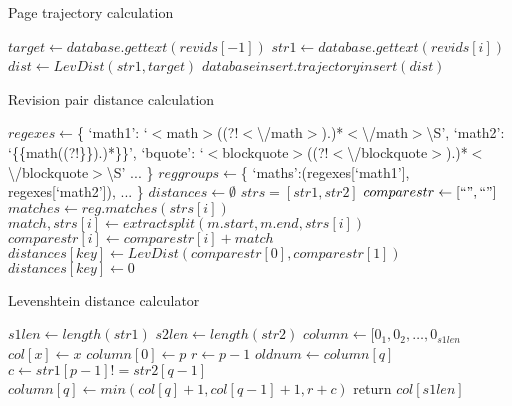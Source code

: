 \begin{algorithm}
\caption{Page trajectory calculation}\label{traj-calc}
  \begin{algorithmic}
    \State $target \gets database.gettext(revids[-1])$ 
    \State $str1 \gets database.gettext(revids[i])$
    \State $dist \gets LevDist(str1, target)$
    \State $databaseinsert.trajectoryinsert(dist)$
    \EndIf
    \EndFor
    \EndProcedure
  \end{algorithmic}
\end{algorithm}

\begin{algorithm}
  \caption{Revision pair distance calculation}\label{dist-calc}
  \begin{algorithmic}
    \State $regexes \gets $\{
    \Statex \tab`math1': `$<$math$>$((?!$<${\textbackslash}/math$>$).)*$<${\textbackslash}/math$>${\textbackslash}S',
    \Statex \tab`math2': `\{\{math((?!\}\}).)*\}\}',
    \Statex \tab`bquote': `$<$blockquote$>$((?!$<${\textbackslash}/blockquote$>$).)*$<${\textbackslash}/blockquote$>${\textbackslash}S'
    \Statex  \tab...
    \Statex\}
    \State $reggroups \gets $\{
    \Statex  \tab`maths':(regexes[`math1'], regexes[`math2']),
    \Statex  \tab...
    \Statex \}
    \State $distances \gets \emptyset$
    \State $strs = [str1, str2]$
    \State $comparestr \gets [``", ``"]$
    \State $matches \gets reg.matches(strs[i])$
    \State $match, strs[i] \gets extractsplit(m.start, m.end, strs[i])$
    \State $comparestr[i] \gets comparestr[i] + match$
    \EndFor
    \EndFor
    \State $distances[key] \gets LevDist(comparestr[0], comparestr[1])$ 
    \Else
    \State $distances[key] \gets 0$
    \EndIf
    \EndFor
    \EndFunction
  \end{algorithmic}
\end{algorithm}

\begin{algorithm}
  \caption{Levenshtein distance calculator}\label{lev-dist}
  \begin{algorithmic}
    \State $s1len \gets length(str1)$
    \State $s2len \gets length(str2)$
    \State $column \gets [0_{1}, 0_{2}, \ldots, 0_{s1len}$
    \State $col[x] \gets x$
    \EndFor
    \State $column[0] \gets p$
    \State $r \gets p-1$
    \State $oldnum \gets column[q]$
    \State $c \gets str1[p-1] != str2[q-1]$
    \State $column[q] \gets min(col[q]+1, col[q-1] + 1, r + c)$
    \EndFor
    \EndFor
    \State return $col[s1len]$
    \EndFunction
  \end{algorithmic}
\end{algorithm}
